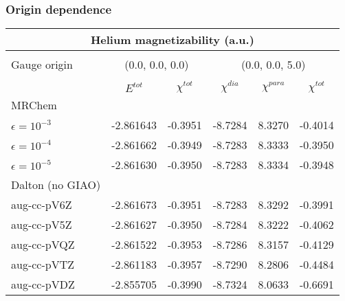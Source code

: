 \begin{frame}
\frametitle{Origin dependence}

\begin{table}
\tiny
\centering
\begin{tabular}{l|ll|lll}
\multicolumn{6}{c}{\textbf{Helium magnetizability (a.u.)}}\\
\hline
\hline
\multicolumn{6}{c}{}\\
\multicolumn{1}{l}{Gauge origin}&
\multicolumn{2}{c}{(0.0, 0.0, 0.0) }&
\multicolumn{3}{c}{(0.0, 0.0, 5.0) }\\
\multicolumn{6}{c}{}\\
\hline
&
\multicolumn{1}{c}{$E^{tot}$}&
\multicolumn{1}{c|}{$\chi^{tot}$}&
\multicolumn{1}{c}{$\chi^{dia}$}&
\multicolumn{1}{c}{$\chi^{para}$}&
\multicolumn{1}{c}{$\chi^{tot}$}\\
\hline
MRChem              &         &       &       &      &       \\
$\epsilon=10^{-3}$  &-2.861643&-0.3951&-8.7284&8.3270&-0.4014\\
$\epsilon=10^{-4}$  &-2.861662&-0.3949&-8.7283&8.3333&-0.3950\\
$\epsilon=10^{-5}$  &-2.861630&-0.3950&-8.7283&8.3334&-0.3948\\
\hline
Dalton (no GIAO)    &         &       &       &      &       \\
aug-cc-pV6Z         &-2.861673&-0.3951&-8.7283&8.3292&-0.3991\\
aug-cc-pV5Z         &-2.861627&-0.3950&-8.7284&8.3222&-0.4062\\
aug-cc-pVQZ         &-2.861522&-0.3953&-8.7286&8.3157&-0.4129\\
aug-cc-pVTZ         &-2.861183&-0.3957&-8.7290&8.2806&-0.4484\\
aug-cc-pVDZ	    &-2.855705&-0.3990&-8.7324&8.0633&-0.6691\\
\hline
\hline
\end{tabular}
\end{table}

\end{frame}
